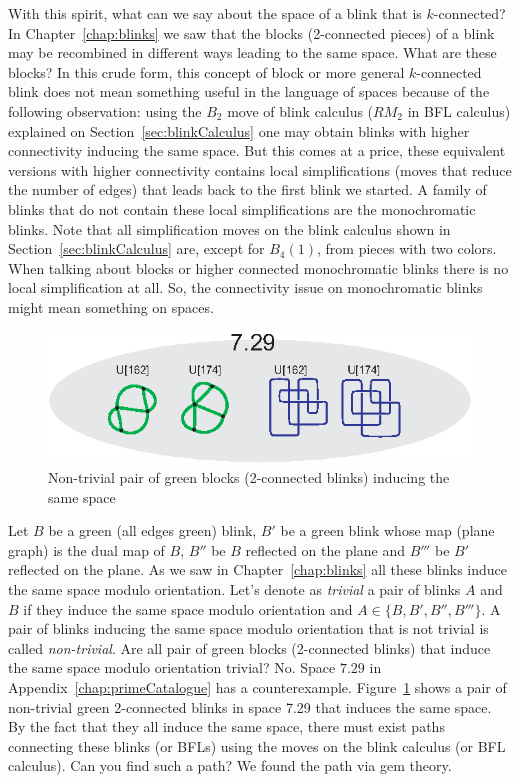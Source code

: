 With this spirit, what can we say about the space of a blink that is
$k$-connected? In Chapter~\ref{chap:blinks} we saw that the blocks
(2-connected pieces) of a blink may be recombined in different
ways leading to the same space. What are these blocks?
In this crude form, this concept of block or more general
$k$-connected blink does not mean something useful in
the language of spaces because of the following
observation: using the $B_2$ move of blink calculus
(\ie $RM_2$ in BFL calculus) explained
on Section~\ref{sec:blinkCalculus} one
may obtain blinks with higher connectivity inducing
the same space. But this comes
at a price, these equivalent versions with higher
connectivity contains local simplifications (moves
that reduce the number of edges) that leads back to
the first blink we started. A family of blinks
that do not contain these local simplifications are the
monochromatic blinks. Note that all simplification moves
on the blink calculus shown in Section~\ref{sec:blinkCalculus}
are, except for $B_4(1)$, from pieces with two colors. When
talking about blocks or higher connected monochromatic
blinks there is no local simplification at all.
So, the connectivity issue on monochromatic blinks
might mean something on spaces.

\begin{figure}[htp]
   \begin{center}
      \leavevmode
      \includegraphics{fig/nonTrivialGreenBlocks.eps}
   \end{center}
   \vspace{-0.7cm}
   \caption{ Non-trivial pair of green blocks (2-connected blinks) inducing the same space}
   \label{fig:nonTrivialGreenBlocks}
\end{figure}

Let $B$ be a green (all edges green) blink, $B'$ be a green blink
whose map (plane graph) is the dual map of $B$, $B''$ be $B$
reflected on the plane and $B'''$ be $B'$ reflected on the plane.
As we saw in Chapter~\ref{chap:blinks} all these blinks induce the
same space modulo orientation. Let's denote as {\it trivial}
a pair of blinks $A$ and $B$ if they induce the same space modulo
orientation and $A \in \{B,B',B'',B'''\}$. A pair of blinks inducing
the same space modulo orientation that is not trivial is called
{\it non-trivial}. Are all pair of green blocks (2-connected blinks)
that induce the same space modulo orientation trivial?
No. Space $7.29$ in Appendix~\ref{chap:primeCatalogue}
has a counterexample. Figure~\ref{fig:nonTrivialGreenBlocks} shows
a pair of non-trivial green 2-connected blinks in space 7.29 that induces
the same space. By the fact that they  all induce the same space, there must exist
paths connecting these blinks (or BFLs) using the moves
on the blink calculus (or BFL
calculus). Can you find such a path? We found the path via gem theory.


